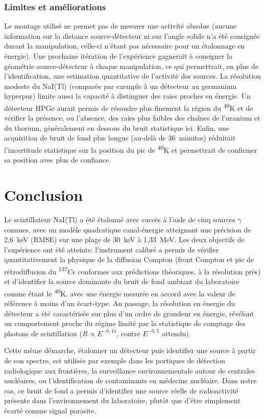\documentclass[11pt,letterpaper]{article}
\begin{document}
\subsubsection*{Limites et améliorations}
Le montage utilisé ne permet pas de mesurer une activité absolue (aucune information sur la distance source-détecteur ni sur l'angle solide n'a été consignée durant la manipulation, celle-ci n'étant pas nécessaire pour un étalonnage en énergie). Une prochaine itération de l'expérience gagnerait à consigner la géométrie source-détecteur à chaque manipulation, ce qui permettrait, en plus de l'identification, une estimation quantitative de l'activité des sources. La résolution modeste du NaI(Tl) (comparée par exemple à un détecteur au germanium hyperpur) limite aussi la capacité à distinguer des raies proches en énergie. Un détecteur HPGe aurait permis de résoudre plus finement la région du \textsuperscript{40}K et de vérifier la présence, ou l'absence, des raies plus faibles des chaînes de l'uranium et du thorium, généralement en dessous du bruit statistique ici. Enfin, une acquisition de bruit de fond plus longue (au-delà de 36~minutes) réduirait l'incertitude statistique sur la position du pic de \textsuperscript{40}K et permettrait de confirmer sa position avec plus de confiance.

\section{Conclusion}

Le scintillateur NaI(Tl) a été étalonné avec succès à l'aide de cinq sources $\gamma$ connues, avec un modèle quadratique canal-énergie atteignant une précision de 2,6~keV (RMSE) sur une plage de 30~keV à 1,33~MeV. Les deux objectifs de l'expérience ont été atteints: l'instrument calibré a permis de vérifier quantitativement la physique de la diffusion Compton (front Compton et pic de rétrodiffusion du \textsuperscript{137}Cs conformes aux prédictions théoriques, à la résolution près) et d'identifier la source dominante du bruit de fond ambiant du laboratoire comme étant le \textsuperscript{40}K, avec une énergie mesurée en accord avec la valeur de référence à moins d'un écart-type. Au passage, la résolution en énergie du détecteur a été caractérisée sur plus d'un ordre de grandeur en énergie, révélant un comportement proche du régime limité par la statistique de comptage des photons de scintillation ($R \propto E^{-0{,}44}$, contre $E^{-0{,}5}$ attendu).

Cette même démarche, étalonner un détecteur puis identifier une source à partir de son spectre, est utilisée par exemple dans les portiques de détection radiologique aux frontières, la surveillance environnementale autour de centrales nucléaires, ou l'identification de contaminants en médecine nucléaire. Dans notre cas, ce bruit de fond a permis d'identifier une source réelle de radioactivité présente dans l'environnement du laboratoire, plutôt que d'être simplement écarté comme signal parasite.
\end{document}
